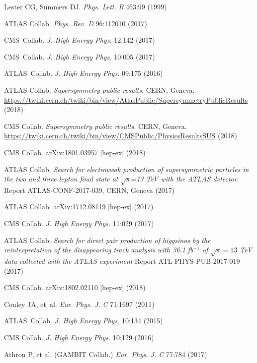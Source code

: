 \documentclass{ar-1col}
\begin{document}
\begin{thebibliography}{175}
Lester CG, Summers DJ. \textit{Phys. Lett.} \textit{B} 463:99 (1999)

{ATLAS Collab.} \textit{Phys. Rev.} \textit{D} 96:112010 (2017)

{CMS~Collab.} \textit{J. High Energy Phys.} 12:142 (2017)

{CMS~Collab.} \textit{J. High Energy Phys.} 10:005 (2017)

{ATLAS~Collab.} \textit{J. High Energy Phys.} 09:175 (2016)

{ATLAS Collab}. \textit{Supersymmetry public results}. CERN, Geneva. \url{https://twiki.cern.ch/twiki/bin/view/AtlasPublic/SupersymmetryPublicResults} (2018)

{CMS Collab}. \textit{Supersymmetry public results}. CERN, Geneva.
\url{https://twiki.cern.ch/twiki/bin/view/CMSPublic/PhysicsResultsSUS} (2018)

{CMS Collab.} arXiv:1801.03957 [hep-ex] (2018)

ATLAS Collab. \textit{Search for electroweak production of supersymmetric particles in the two and three lepton final state at} $\sqrt{s}$=\textit{13 TeV with the ATLAS detector}.
Report ATLAS-CONF-2017-039, CERN, Geneva (2017)

{ATLAS Collab}. arXiv:1712.08119 [hep-ex] (2017)

{CMS Collab}. \textit{J. High Energy Phys.} 11:029 (2017)

{ATLAS Collab}. \textit{Search for direct pair production of higgsinos by the reinterpretation of the disappearing track analysis with 36.1 fb$^{-1}$ of $\sqrt{s}=13$ TeV data collected with the ATLAS experiment} Report ATL-PHYS-PUB-2017-019 (2017)
               
{CMS Collab}. arXiv:1802.02110 [hep-ex] (2018)

Conley JA, et~al. \textit{Eur. Phys. J.} \textit{C} 71:1697 (2011)

{ATLAS~Collab.} \textit{J. High Energy Phys.} 10:134 (2015)

{CMS Collab}. \textit{J. High Energy Phys.} 10:129 (2016)

{Athron P, et al. (GAMBIT Collab}.) \textit{Eur. Phys. J.} \textit{C} 77:784 (2017)


\end{thebibliography}
\end{document}
